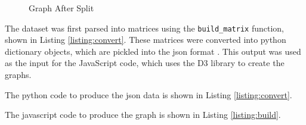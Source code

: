 \begin{figure}[h!]
\centering
{}
\caption{Graph After Split}
\label{fig:split_graph}
\end{figure}

\clearpage

The dataset was first parsed into matrices using the {\tt build\_matrix} function, shown in Listing \ref{listing:convert}. These matrices were converted into python dictionary objects, which are pickled \cite{py:pickle} into the json format \cite{json}. This output was used as the input for the JavaScript code, which uses the D3 library \cite{d3} to create the graphs.

The python code to produce the json data is shown in Listing \ref{listing:convert}.



\clearpage

The javascript code to produce the graph is shown in Listing \ref{listing:build}.


